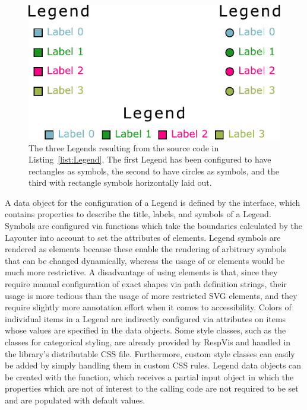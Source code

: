 \begin{figure}[tp]
\centering
\includegraphics[keepaspectratio,width=\linewidth / 2,height=\fullh]
{diagrams/legend.pdf}
\caption[Legend Example]{%
The three Legends resulting from the source code in
Listing~\ref{list:Legend}. The first Legend has been configured to have
rectangles as symbols, the second to have circles as
symbols, and the third with rectangle symbols horizontally laid out.
}
\label{fig:Legend}
\end{figure}



A data object for the configuration of a Legend is defined by the
 interface, which contains properties to describe the
title, labels, and symbols of a Legend. Symbols are configured via
functions which take the boundaries calculated by the
Layouter into account to set the  attributes of
 elements. Legend symbols are rendered as
 elements because these enable the rendering of
arbitrary symbols that can be changed dynamically, whereas the usage
of  or  elements would be much more
restrictive. A disadvantage of using  elements is that,
since they require manual configuration of exact shapes via path
definition strings, their usage is more tedious than the usage of more
restricted SVG elements, and they require slightly more annotation
effort when it comes to accessibility. Colors of individual items in a
Legend are indirectly configured via  attributes
on items whose values are specified in the  data objects.
Some style classes, such as the  classes for
categorical styling, are already provided by RespVis and handled in
the library's distributable CSS file. Furthermore, custom style
classes can easily be added by simply handling them in custom CSS
rules. Legend data objects can be created with the 
function, which receives a partial input object in which the
properties which are not of interest to the calling code are not
required to be set and are populated with default values.

